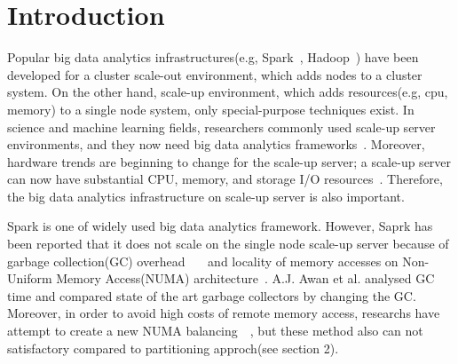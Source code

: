 \section{Introduction} \label{sec:introduction}
Popular big data analytics infrastructures(e.g, Spark~\cite{Zaharia2012RDD},
Hadoop~\cite{Shvachko2010HDF}) have been developed for a cluster scale-out
environment, which adds nodes to a cluster system.
On the other hand, scale-up environment, which adds resources(e.g, cpu, memory)
to a single node system, only special-purpose techniques exist.
In science and machine learning fields, researchers
commonly used scale-up server environments, and they now need big data analytics
frameworks~\cite{Chaimov2016SSH}.
Moreover, hardware trends are beginning to change for the scale-up
server; a scale-up server can now have substantial CPU, memory,
and storage I/O resources~\cite{Appuswamy2013SVS}.
Therefore, the big data analytics infrastructure on scale-up server is
also important.

Spark is one of widely used big data analytics framework.
However, Saprk has been reported that it does
not scale on the single node scale-up server because of garbage
collection(GC)
overhead~\cite{Ahsan2016SVS}~\cite{Ousterhout2015MSP}~\cite{Maas2016THL} and
locality of memory accesses on Non-Uniform Memory Access(NUMA)
architecture~\cite{Cao2016ADS}.
A.J. Awan et al. analysed GC time and compared state of the art
garbage collectors by changing the GC.
Moreover, in order to avoid high costs of remote memory access, researchs have
attempt to create a new NUMA balancing~\cite{Dashti2013TMH}~\cite{AutoNUMA}, but
these method also can not satisfactory compared to partitioning approch(see section 2).


